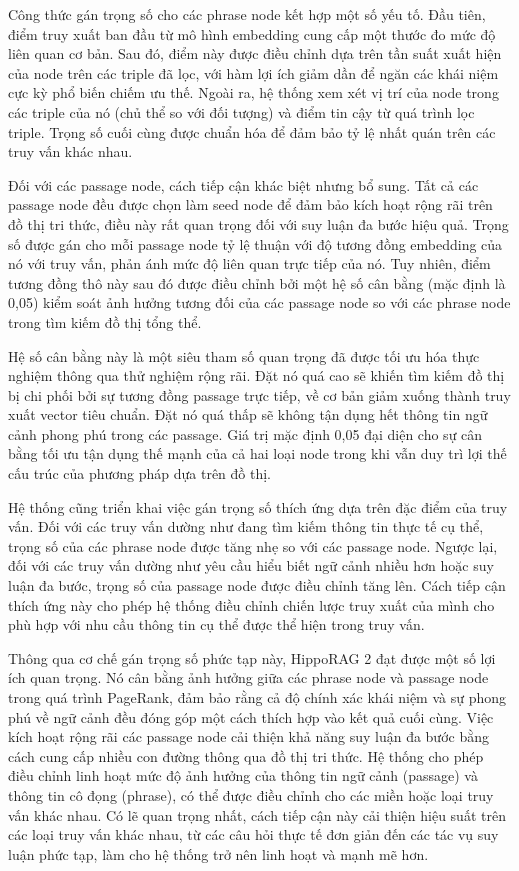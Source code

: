 \documentclass[../main.tex]{subfiles}
\begin{document}
Công thức gán trọng số cho các phrase node kết hợp một số yếu tố. Đầu tiên, điểm truy xuất ban đầu từ mô hình embedding cung cấp một thước đo mức độ liên quan cơ bản. Sau đó, điểm này được điều chỉnh dựa trên tần suất xuất hiện của node trên các triple đã lọc, với hàm lợi ích giảm dần để ngăn các khái niệm cực kỳ phổ biến chiếm ưu thế. Ngoài ra, hệ thống xem xét vị trí của node trong các triple của nó (chủ thể so với đối tượng) và điểm tin cậy từ quá trình lọc triple. Trọng số cuối cùng được chuẩn hóa để đảm bảo tỷ lệ nhất quán trên các truy vấn khác nhau.

Đối với các passage node, cách tiếp cận khác biệt nhưng bổ sung. Tất cả các passage node đều được chọn làm seed node để đảm bảo kích hoạt rộng rãi trên đồ thị tri thức, điều này rất quan trọng đối với suy luận đa bước hiệu quả. Trọng số được gán cho mỗi passage node tỷ lệ thuận với độ tương đồng embedding của nó với truy vấn, phản ánh mức độ liên quan trực tiếp của nó. Tuy nhiên, điểm tương đồng thô này sau đó được điều chỉnh bởi một hệ số cân bằng (mặc định là 0,05) kiểm soát ảnh hưởng tương đối của các passage node so với các phrase node trong tìm kiếm đồ thị tổng thể.

Hệ số cân bằng này là một siêu tham số quan trọng đã được tối ưu hóa thực nghiệm thông qua thử nghiệm rộng rãi. Đặt nó quá cao sẽ khiến tìm kiếm đồ thị bị chi phối bởi sự tương đồng passage trực tiếp, về cơ bản giảm xuống thành truy xuất vector tiêu chuẩn. Đặt nó quá thấp sẽ không tận dụng hết thông tin ngữ cảnh phong phú trong các passage. Giá trị mặc định 0,05 đại diện cho sự cân bằng tối ưu tận dụng thế mạnh của cả hai loại node trong khi vẫn duy trì lợi thế cấu trúc của phương pháp dựa trên đồ thị.

Hệ thống cũng triển khai việc gán trọng số thích ứng dựa trên đặc điểm của truy vấn. Đối với các truy vấn dường như đang tìm kiếm thông tin thực tế cụ thể, trọng số của các phrase node được tăng nhẹ so với các passage node. Ngược lại, đối với các truy vấn dường như yêu cầu hiểu biết ngữ cảnh nhiều hơn hoặc suy luận đa bước, trọng số của passage node được điều chỉnh tăng lên. Cách tiếp cận thích ứng này cho phép hệ thống điều chỉnh chiến lược truy xuất của mình cho phù hợp với nhu cầu thông tin cụ thể được thể hiện trong truy vấn.

Thông qua cơ chế gán trọng số phức tạp này, HippoRAG 2 đạt được một số lợi ích quan trọng. Nó cân bằng ảnh hưởng giữa các phrase node và passage node trong quá trình PageRank, đảm bảo rằng cả độ chính xác khái niệm và sự phong phú về ngữ cảnh đều đóng góp một cách thích hợp vào kết quả cuối cùng. Việc kích hoạt rộng rãi các passage node cải thiện khả năng suy luận đa bước bằng cách cung cấp nhiều con đường thông qua đồ thị tri thức. Hệ thống cho phép điều chỉnh linh hoạt mức độ ảnh hưởng của thông tin ngữ cảnh (passage) và thông tin cô đọng (phrase), có thể được điều chỉnh cho các miền hoặc loại truy vấn khác nhau. Có lẽ quan trọng nhất, cách tiếp cận này cải thiện hiệu suất trên các loại truy vấn khác nhau, từ các câu hỏi thực tế đơn giản đến các tác vụ suy luận phức tạp, làm cho hệ thống trở nên linh hoạt và mạnh mẽ hơn.
\end{document}
